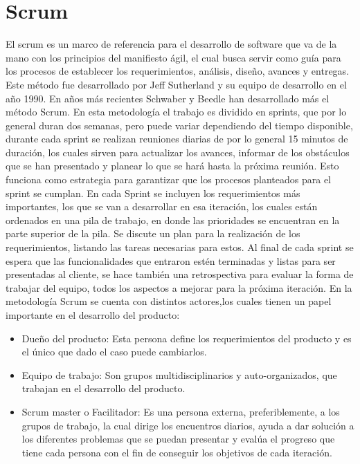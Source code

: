 \section{Scrum}
El scrum es un marco de referencia para el desarrollo de software que va de la mano con los principios del manifiesto ágil, el cual busca servir como guía para los procesos de establecer los requerimientos, análisis, diseño, avances y entregas.
Este método fue desarrollado por Jeff Sutherland y su equipo de desarrollo en el año 1990. En años más recientes Schwaber y Beedle han desarrollado más el método Scrum.\cite{Pressman_2010}
En esta metodología el trabajo es dividido en sprints, que por lo general duran dos semanas, pero puede variar dependiendo del tiempo disponible, durante cada sprint se realizan reuniones diarias de por lo general 15 minutos de duración, los cuales sirven para actualizar los avances, informar de los obstáculos que se han presentado y planear lo que se hará hasta la próxima reunión. Esto funciona como estrategia para garantizar que los procesos planteados para el sprint se cumplan.
\newline
\newline
En cada Sprint se incluyen los requerimientos más importantes, los que se van a desarrollar en esa iteración, los cuales están ordenados en una pila de trabajo, en donde las prioridades se encuentran en la parte superior de la pila. Se discute un plan para la realización de los requerimientos, listando las tareas necesarias para estos. Al final de cada sprint se espera que las funcionalidades que entraron estén terminadas y listas para ser presentadas al cliente, se hace también una retrospectiva para evaluar la forma de trabajar del equipo, todos los aspectos a mejorar para la próxima iteración.
\newline
\newline
En la metodología Scrum se cuenta con distintos actores,los cuales tienen un papel importante en el desarrollo del producto:
\newline
\begin{itemize}
	\item Dueño del producto: Esta persona define los requerimientos del producto y es el único que dado el caso puede cambiarlos.
	\item Equipo de trabajo: Son grupos multidisciplinarios y auto-organizados, que trabajan en el desarrollo del producto.
	\item Scrum master o Facilitador: Es una persona externa, preferiblemente, a los grupos de trabajo, la cual dirige los encuentros diarios, ayuda a dar solución a los diferentes problemas que se puedan presentar y evalúa el progreso que tiene cada persona con el fin de conseguir los objetivos de cada iteración.
\end{itemize} 
\newpage
